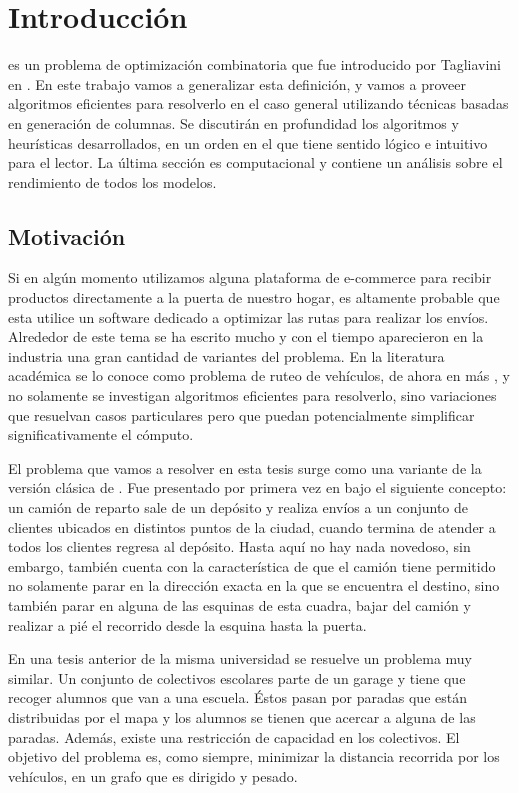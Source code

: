 \chapter{Introducción}

 es un problema de optimización combinatoria que fue introducido por Tagliavini en \cite{tagliavini}. En este trabajo vamos a generalizar esta definición, y vamos a proveer algoritmos eficientes para resolverlo en el caso general utilizando técnicas basadas en generación de columnas. Se discutirán en profundidad los algoritmos y heurísticas desarrollados, en un orden en el que tiene sentido lógico e intuitivo para el lector. La última sección es computacional y contiene un análisis sobre el rendimiento de todos los modelos. 


\section{Motivación}

Si en algún momento utilizamos alguna plataforma de e-commerce para recibir productos directamente a la puerta de nuestro hogar, es altamente probable que esta utilice un software dedicado a optimizar las rutas para realizar los envíos. Alrededor de este tema se ha escrito mucho y con el tiempo aparecieron en la industria una gran cantidad de variantes del problema. En la literatura académica se lo conoce como problema de ruteo de vehículos, de ahora en más , y no solamente se investigan algoritmos eficientes para resolverlo, sino variaciones que resuelvan casos particulares pero que puedan potencialmente simplificar significativamente el cómputo. 

El problema que vamos a resolver en esta tesis surge como una variante de la versión clásica de . Fue presentado por primera vez en \cite{tagliavini} bajo el siguiente concepto: un camión de reparto sale de un depósito y realiza envíos a un conjunto de clientes ubicados en distintos puntos de la ciudad, cuando termina de atender a todos los clientes regresa al depósito. Hasta aquí no hay nada novedoso, sin embargo, también cuenta con la característica de que el camión tiene permitido no solamente parar en la dirección exacta en la que se encuentra el destino, sino también parar en alguna de las esquinas de esta cuadra, bajar del camión y realizar a pié el recorrido desde la esquina hasta la puerta.

En una tesis anterior de la misma universidad \cite{mongi-badia} se resuelve un problema muy similar. Un conjunto de colectivos escolares parte de un garage y tiene que recoger alumnos que van a una escuela. Éstos pasan por paradas que están distribuidas por el mapa y los alumnos se tienen que acercar a alguna de las paradas. Además, existe una restricción de capacidad en los colectivos. El objetivo del problema es, como siempre, minimizar la distancia recorrida por los vehículos, en un grafo que es dirigido y pesado.

